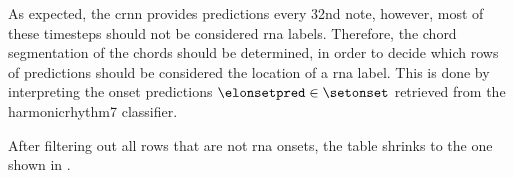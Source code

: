 
As expected, the \gls{crnn} provides predictions every
\gls{32nd} note, however, most of these timesteps should not
be considered \gls{rna} labels. Therefore, the chord
segmentation of the chords should be determined, in order to
decide which rows of predictions should be considered the
location of a \gls{rna} label. This is done by interpreting
the onset predictions $\elonsetpred \in \setonset$ retrieved
from the \gls{harmonicrhythm7} classifier.

After filtering out all rows that are not \gls{rna} onsets,
the table shrinks to the one shown in
.


